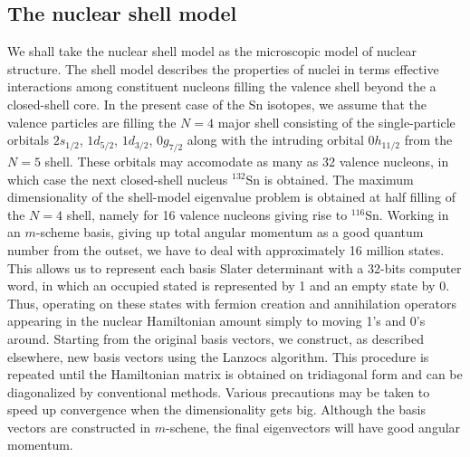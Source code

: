 \documentclass{ws-p8-50x6-00}
\begin{document}
\subsection{The nuclear shell model}
We shall take the nuclear shell model as the microscopic 
model of nuclear structure. The shell model describes the 
properties of nuclei in terms effective interactions 
among constituent nucleons filling the valence shell  
beyond the a closed-shell core. In the present case of the Sn 
isotopes, we assume that the valence particles are filling 
the $N = 4$ major shell consisting of the single-particle orbitals 
$2s_{1/2}$, $1d_{5/2}$, $1 d_{3/2}$, $0g_{7/2}$ along with the intruding 
orbital $0h_{11/2}$ from the $N = 5$ shell. These orbitals may accomodate 
as many as 32 valence nucleons, in which case the next closed-shell 
nucleus $^{132}$Sn is obtained. The maximum dimensionality of the 
shell-model eigenvalue problem is obtained at half filling of 
the $N = 4$ shell, namely for 16 valence nucleons giving rise to $^{116}$Sn. 
Working in an $m$-scheme basis, giving up total angular momentum 
as a good quantum number from the outset, we have to deal with 
approximately 16 million states. This allows us to represent 
each basis Slater determinant with a 32-bits computer word, in which 
an occupied stated is represented by 1 and an empty state by 0. 
Thus, operating on these states with fermion creation and 
annihilation operators appearing in the nuclear Hamiltonian amount 
simply to moving 1's and 0's around. Starting from the original basis 
vectors, we construct, as described elsewhere, new basis vectors 
using the Lanzocs algorithm. This procedure is repeated until the 
Hamiltonian matrix is obtained on tridiagonal form and can be 
diagonalized by conventional methods. Various precautions may be 
taken to speed up convergence when the dimensionality gets big. 
Although the basis vectors are constructed in $m$-schene, 
the final eigenvectors will have good angular momentum.
\end{document}
